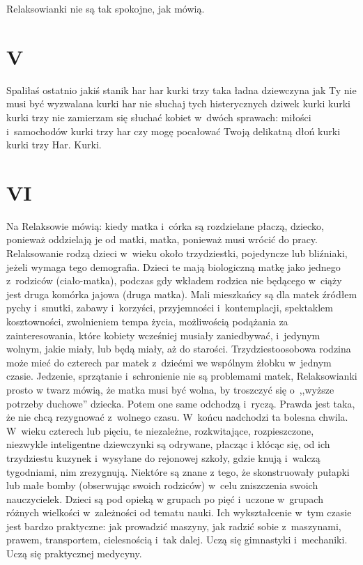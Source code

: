 \documentclass[oneside,polish,12pt,sfheadings]{mwbk}
\begin{document}
Relaksowianki nie są tak spokojne, jak mówią.

\chapter{V}

Spaliłaś ostatnio jakiś stanik har har kurki trzy taka ładna dziewczyna
jak Ty nie musi być wyzwalana kurki har nie słuchaj tych histerycznych
dziwek kurki kurki kurki trzy nie zamierzam się słuchać kobiet w~dwóch
sprawach: miłości i~samochodów kurki trzy har czy mogę pocałować Twoją
delikatną dłoń kurki kurki trzy Har. Kurki.

\chapter{VI}

Na Relaksowie mówią: kiedy matka i~córka są rozdzielane płaczą, dziecko,
ponieważ oddzielają je od matki, matka, ponieważ musi wrócić do pracy.
Relaksowanie rodzą dzieci w~wieku około trzydziestki, pojedyncze lub
bliźniaki, jeżeli wymaga tego demografia. Dzieci te mają biologiczną
matkę jako jednego z~rodziców (ciało-matka), podczas gdy wkładem rodzica
nie będącego w~ciąży jest druga komórka jajowa (druga matka). Mali
mieszkańcy są dla matek źródłem pychy i~smutki, zabawy i~korzyści,
przyjemności i~kontemplacji, spektaklem kosztowności, zwolnieniem
tempa życia, możliwością podążania za zainteresowania, które kobiety
wcześniej musiały zaniedbywać, i~jedynym wolnym, jakie miały, lub
będą miały, aż do starości. Trzydziestoosobowa rodzina może mieć do
czterech par matek z~dziećmi we wspólnym żłobku w~jednym czasie. Jedzenie,
sprzątanie i~schronienie nie są problemami matek, Relaksowianki prosto
w twarz mówią, że matka musi być wolna, by troszczyć się o~,,wyższe
potrzeby duchowe'' dziecka. Potem one same odchodzą i~ryczą. Prawda
jest taka, że nie chcą rezygnować z~wolnego czasu. W~końcu nadchodzi
ta bolesna chwila. W~wieku czterech lub pięciu, te niezależne, rozkwitające,
rozpieszczone, niezwykle inteligentne dziewczynki są odrywane, płacząc
i kłócąc się, od ich trzydziestu kuzynek i~wysyłane do rejonowej szkoły,
gdzie knują i~walczą tygodniami, nim zrezygnują. Niektóre są znane
z tego, że skonstruowały pułapki lub małe bomby (obserwując swoich
rodziców) w~celu zniszczenia swoich nauczycielek. Dzieci są pod opieką
w grupach po pięć i~uczone w~grupach różnych wielkości w~zależności
od tematu nauki. Ich wykształcenie w~tym czasie jest bardzo praktyczne:
jak prowadzić maszyny, jak radzić sobie z~maszynami, prawem, transportem,
cielesnością i~tak dalej. Uczą się gimnastyki i~mechaniki. Uczą się
praktycznej medycyny.
\end{document}

